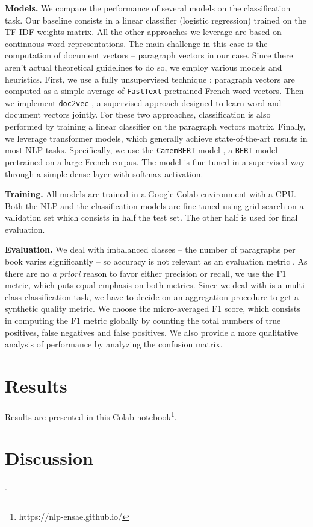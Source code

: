 \documentclass[11pt,a4paper]{article}
\begin{document}
\textbf{Models.} We compare the performance of several models on the classification task. Our baseline consists in a linear classifier (logistic regression) trained on the TF-IDF weights matrix. All the other approaches we leverage are based on continuous word representations. The main challenge in this case is the computation of document vectors -- paragraph vectors in our case. Since there aren't actual theoretical guidelines to do so, we employ various models and heuristics. First, we use a fully unsupervised technique : paragraph vectors are computed as a simple average of \verb|FastText| \cite{joulin2016bag} pretrained French word vectors. Then we implement \verb|doc2vec| \cite{le2014distributed}, a supervised approach designed to learn word and document vectors jointly. For these two approaches, classification is also performed by training a linear classifier on the paragraph vectors matrix. Finally, we leverage transformer models, which generally achieve state-of-the-art results in most NLP tasks. Specifically, we use the \verb|CamemBERT| model \cite{martin2019camembert}, a \verb|BERT| model pretrained on a large French corpus. The model is fine-tuned in a supervised way through a simple dense layer with softmax activation.

\textbf{Training.} All models are trained in a Google Colab environment with a CPU. Both the NLP and the classification models are fine-tuned using grid search on a validation set which consists in half the test set. The other half is used for final evaluation.

\textbf{Evaluation.}  We deal with imbalanced classes -- the number of paragraphs per book varies significantly -- so accuracy is not relevant as an evaluation metric . As there are no \textit{a priori} reason to favor either precision or recall, we use the F1 metric, which puts equal emphasis on both metrics. Since we deal with is a multi-class classification task, we have to decide on an aggregation procedure to get a synthetic quality metric. We choose the micro-averaged F1 score, which consists in computing the F1 metric globally by counting the total numbers of true positives, false negatives and false positives. We also provide a more qualitative analysis of performance by analyzing the confusion matrix. \\

\section{Results}

Results are presented in this Colab notebook\footnote{https://nlp-ensae.github.io/}.

\section{Discussion}




\newpage
.
\newpage



\end{document}
